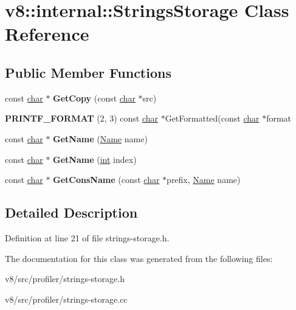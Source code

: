 \hypertarget{classv8_1_1internal_1_1StringsStorage}{}\section{v8\+:\+:internal\+:\+:Strings\+Storage Class Reference}
\label{classv8_1_1internal_1_1StringsStorage}
\subsection*{Public Member Functions}
\begin{DoxyCompactItemize}
\item 
\mbox{\label{classv8_1_1internal_1_1StringsStorage_aa01abe028db7c4dac78ea7ec256732b9}} 
const \mbox{\hyperlink{classchar}{char}} $\ast$ {\bfseries Get\+Copy} (const \mbox{\hyperlink{classchar}{char}} $\ast$src)
\item 
\mbox{\label{classv8_1_1internal_1_1StringsStorage_ae271742bdf0ff845520817fb03191c21}} 
{\bfseries P\+R\+I\+N\+T\+F\+\_\+\+F\+O\+R\+M\+AT} (2, 3) const \mbox{\hyperlink{classchar}{char}} $\ast$Get\+Formatted(const \mbox{\hyperlink{classchar}{char}} $\ast$format
\item 
\mbox{\label{classv8_1_1internal_1_1StringsStorage_af46167dfff45d7db22f2c5d474b165b2}} 
const \mbox{\hyperlink{classchar}{char}} $\ast$ {\bfseries Get\+Name} (\mbox{\hyperlink{classv8_1_1internal_1_1Name}{Name}} name)
\item 
\mbox{\label{classv8_1_1internal_1_1StringsStorage_ab4380a43d25941062646c82ec9854018}} 
const \mbox{\hyperlink{classchar}{char}} $\ast$ {\bfseries Get\+Name} (\mbox{\hyperlink{classint}{int}} index)
\item 
\mbox{\label{classv8_1_1internal_1_1StringsStorage_a8534c91a8f641eb7ccdd72f72f6a6515}} 
const \mbox{\hyperlink{classchar}{char}} $\ast$ {\bfseries Get\+Cons\+Name} (const \mbox{\hyperlink{classchar}{char}} $\ast$prefix, \mbox{\hyperlink{classv8_1_1internal_1_1Name}{Name}} name)
\end{DoxyCompactItemize}


\subsection{Detailed Description}


Definition at line 21 of file strings-\/storage.\+h.



The documentation for this class was generated from the following files\+:\begin{DoxyCompactItemize}
\item 
v8/src/profiler/strings-\/storage.\+h\item 
v8/src/profiler/strings-\/storage.\+cc\end{DoxyCompactItemize}
